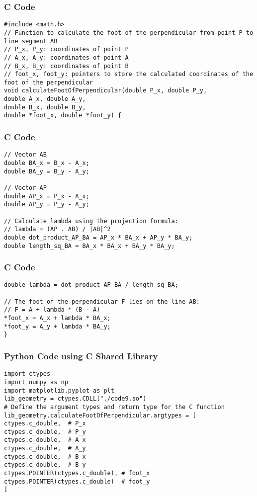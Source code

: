 \documentclass{beamer}
\begin{document}
\begin{frame}[fragile]
\frametitle{C Code}
\begin{lstlisting}
#include <math.h>
// Function to calculate the foot of the perpendicular from point P to line segment AB
// P_x, P_y: coordinates of point P
// A_x, A_y: coordinates of point A
// B_x, B_y: coordinates of point B
// foot_x, foot_y: pointers to store the calculated coordinates of the foot of the perpendicular
void calculateFootOfPerpendicular(double P_x, double P_y,
double A_x, double A_y,
double B_x, double B_y,
double *foot_x, double *foot_y) {
\end{lstlisting}
\end{frame}

\begin{frame}[fragile]
\frametitle{C Code}
\begin{lstlisting}
// Vector AB
double BA_x = B_x - A_x;
double BA_y = B_y - A_y;

// Vector AP
double AP_x = P_x - A_x;
double AP_y = P_y - A_y;

// Calculate lambda using the projection formula:
// lambda = (AP . AB) / |AB|^2
double dot_product_AP_BA = AP_x * BA_x + AP_y * BA_y;
double length_sq_BA = BA_x * BA_x + BA_y * BA_y;
\end{lstlisting}
\end{frame}

\begin{frame}[fragile]
\frametitle{C Code}
\begin{lstlisting}
double lambda = dot_product_AP_BA / length_sq_BA;

// The foot of the perpendicular F lies on the line AB:
// F = A + lambda * (B - A)
*foot_x = A_x + lambda * BA_x;
*foot_y = A_y + lambda * BA_y;
}
\end{lstlisting}
\end{frame}

\begin{frame}[fragile]
\frametitle{Python Code using C Shared Library}
\begin{lstlisting}
import ctypes
import numpy as np
import matplotlib.pyplot as plt
lib_geometry = ctypes.CDLL("./code9.so")
# Define the argument types and return type for the C function
lib_geometry.calculateFootOfPerpendicular.argtypes = [
ctypes.c_double,  # P_x
ctypes.c_double,  # P_y
ctypes.c_double,  # A_x
ctypes.c_double,  # A_y
ctypes.c_double,  # B_x
ctypes.c_double,  # B_y
ctypes.POINTER(ctypes.c_double), # foot_x
ctypes.POINTER(ctypes.c_double)  # foot_y
]
\end{lstlisting}
\end{frame}
\end{document}
